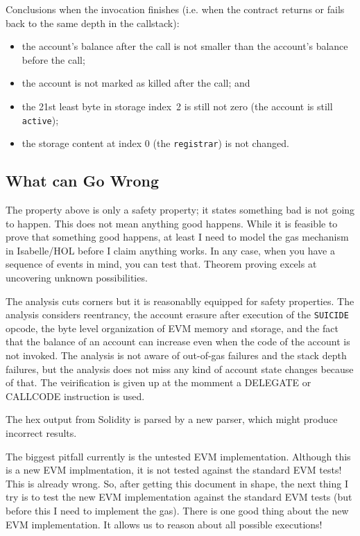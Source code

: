 \documentclass[11pt,a4paper]{article}
\begin{document}
Conclusions when the invocation finishes (i.e. when the contract returns or fails back to the same depth in the callstack):
\begin{itemize}
  \item the account's balance after the call is not smaller than the
    account's balance before the call;
  \item the account is not marked as killed after the call; and
  \item the 21st least byte in storage index~2 is still not zero (the account is still \texttt{active});
  \item the storage content at index 0 (the \texttt{registrar}) is not changed.
\end{itemize}


\subsection{What can Go Wrong}

The property above is only a safety property; it states something bad is not going to happen.  This does not mean anything good happens.  While it is feasible to prove that something good happens, at least I need to model the gas mechanism in Isabelle/HOL before I claim anything works.  In any case, when you have a sequence of events in mind, you can test that.  Theorem proving excels at uncovering unknown possibilities.

The analysis cuts corners but it is reasonablly equipped for safety
properties.  The analysis considers reentrancy, the account erasure after execution
of the \texttt{SUICIDE} opcode, the byte level organization of EVM
memory and storage, and the fact that the balance of an account can
increase even when the code of the account is not invoked.
The analysis is not aware of out-of-gas failures and the stack depth
failures, but the analysis does not miss any kind of account state
changes because of that.  The veirification is given up at the momment
a DELEGATE or CALLCODE instruction is used.

The hex output from Solidity is parsed by a new parser, which might produce incorrect results.

The biggest pitfall currently is the untested EVM implementation.
Although this is a new EVM implmentation, it is not
tested against the standard EVM tests!  This is already wrong.
So, after getting this document in shape, the next thing I try is to
test the new EVM implementation against the standard EVM tests (but before this I need to implement the gas).
There is one good thing about the new EVM implementation. It allows us to reason about all possible executions!
\end{document}

